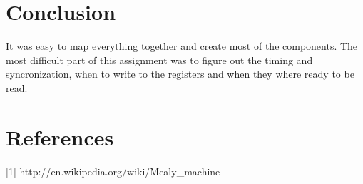 \documentclass[10pt]{report}
\begin{document}
\section*{Conclusion}


It was easy to map everything together and create most of the components. 
The most difficult part of this assignment was to figure out the timing 
and syncronization, when to write to the registers and when they where 
ready to be read.

\section*{References}

[1] http://en.wikipedia.org/wiki/Mealy\_machine
\end{document}
